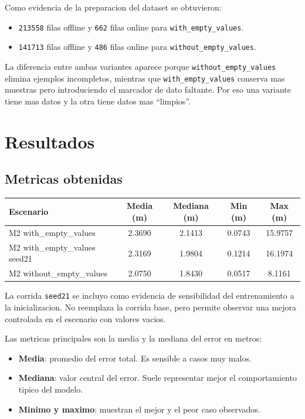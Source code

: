\documentclass[11pt,a4paper]{article}
\begin{document}
Como evidencia de la preparacion del dataset se obtuvieron:
\begin{itemize}
\item \texttt{213558} filas offline y \texttt{662} filas online para \texttt{with\_empty\_values}.
\item \texttt{141713} filas offline y \texttt{486} filas online para \texttt{without\_empty\_values}.
\end{itemize}

La diferencia entre ambas variantes aparece porque \texttt{without\_empty\_values} elimina ejemplos incompletos, mientras que \texttt{with\_empty\_values} conserva mas muestras pero introduciendo el marcador de dato faltante. Por eso una variante tiene mas datos y la otra tiene datos mas ``limpios''.

\section{Resultados}
\subsection{Metricas obtenidas}
\begin{center}
\begin{tabular}{>{\raggedright\arraybackslash}p{4.2cm}cccc}
\toprule
Escenario & Media (m) & Mediana (m) & Min (m) & Max (m) \\
\midrule
M2 with\_empty\_values & 2.3690 & 2.1413 & 0.0743 & 15.9757 \\
M2 with\_empty\_values seed21 & 2.3169 & 1.9804 & 0.1214 & 16.1974 \\
M2 without\_empty\_values & 2.0750 & 1.8430 & 0.0517 & 8.1161 \\
\bottomrule
\end{tabular}
\end{center}

La corrida \texttt{seed21} se incluyo como evidencia de sensibilidad del entrenamiento a la inicializacion. No reemplaza la corrida base, pero permite observar una mejora controlada en el escenario con valores vacios.

Las metricas principales son la media y la mediana del error en metros:
\begin{itemize}
\item \textbf{Media}: promedio del error total. Es sensible a casos muy malos.
\item \textbf{Mediana}: valor central del error. Suele representar mejor el comportamiento tipico del modelo.
\item \textbf{Minimo y maximo}: muestran el mejor y el peor caso observados.
\end{itemize}
\end{document}
